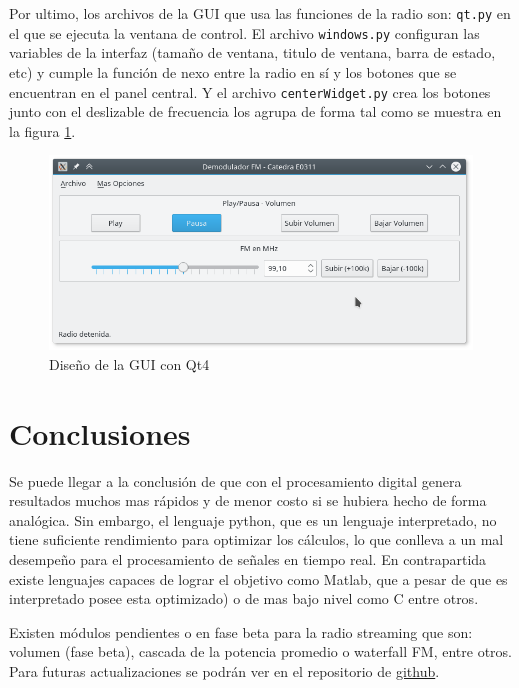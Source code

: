 Por ultimo, los archivos de la GUI que usa las funciones de la radio son: \texttt{qt.py} en el que se ejecuta la ventana de control. El archivo \texttt{windows.py} configuran las variables de la interfaz (tamaño de ventana, titulo de ventana, barra de estado, etc) y cumple la función de nexo entre la radio en sí y los botones que se encuentran en el panel central.
Y el archivo \texttt{centerWidget.py} crea los botones junto con el deslizable de frecuencia los agrupa de forma tal como se muestra en la figura \ref{fig:gui}.

\begin{figure}[ht!]
	\centering
	\includegraphics[scale=0.7]{./imagenes/gui.png}
	\caption{Diseño de la GUI con Qt4}
	\label{fig:gui}
\end{figure}

\section{Conclusiones}

Se puede llegar a la conclusión de que con el procesamiento digital genera resultados muchos mas rápidos y de menor costo si se hubiera hecho de forma analógica.
Sin embargo, el lenguaje python, que es un lenguaje interpretado, no tiene suficiente rendimiento para optimizar los cálculos, lo que conlleva a un mal desempeño para el procesamiento de señales en tiempo real. En contrapartida existe lenguajes capaces de lograr el objetivo como Matlab, que a pesar de que es interpretado posee esta optimizado) o de mas bajo nivel como C entre otros.

Existen módulos pendientes o en fase beta para la radio streaming que son: volumen (fase beta), cascada de la potencia promedio o waterfall FM, entre otros.
Para futuras actualizaciones se podrán ver en el repositorio de \href{https://github.com/nternouski/comunicaciones}{github}.
